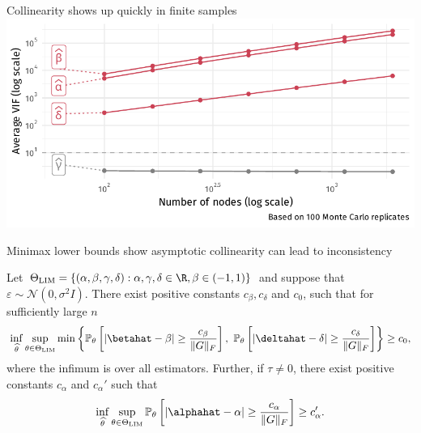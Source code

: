 \documentclass[aspectratio=169]{beamer}
\theoremstyle{remark}
\begin{document}
\begin{frame}{Collinearity shows up quickly in finite samples}
    \vspace{3mm}
    \centering
    \includegraphics{./figures/simulations/defense-vif.pdf}
\end{frame}

\begin{frame}{Minimax lower bounds show asymptotic collinearity can lead to inconsistency}
    
    \begin{theorem}
        Let $\Theta_\mathrm{LIM}= \left\{ (\alpha,\beta,\gamma,\delta) : \alpha,\gamma,\delta \in \R, \beta \in (-1,1) \right\}$ and suppose that $\varepsilon \sim \mathcal N(0, \sigma^2 I)$. There exist positive constants $c_\beta,c_\delta$ and $c_0$, such that for sufficiently large $n$
        \begin{equation*} \label{eq:minimax:betadelta}
            \inf_{\widehat{\theta}} \sup_{\theta \in \Theta_\mathrm{LIM}}
            \min\left\{
            \mathbb{P}_{\theta}\left[
                \left| \betahat - \beta \right| \ge \frac{c_\beta}{\| G \|_F} \right] ,
            ~
            \mathbb{P}_{\theta}\left[
                \left| \deltahat - \delta \right| \ge \frac{c_\delta}{\| G \|_F} \right]
            \right\} 
            \ge c_0 ,
        \end{equation*}
        where the infimum is over all estimators. Further, if $\tau \neq 0$, there exist positive constants $c_\alpha$ and $c_\alpha'$ such that
        \begin{equation*}
            \inf_{\widehat{\theta}} \sup_{\theta \in \Theta_\mathrm{LIM}}
            \mathbb{P}_{\theta}\left[
                \left| \alphahat - \alpha \right| \ge \frac{c_\alpha}{\| G \|_F} \right]
            \ge c_\alpha' .
        \end{equation*}
    \end{theorem}
\end{frame}
\end{document}
